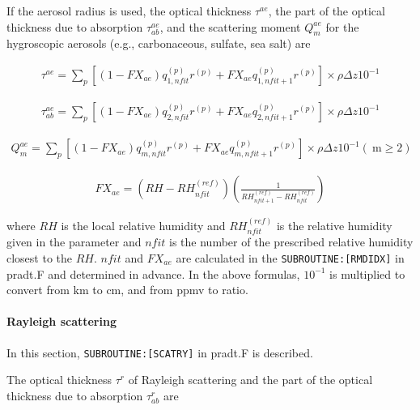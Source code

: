 If the aerosol radius is used, the optical thickness \(\tau^{a e}\), the
part of the optical thickness due to absorption \(\tau_{ab}^{a e}\), and
the scattering moment \(Q_{m}^{a e}\) for the hygroscopic aerosols
(e.g., carbonaceous, sulfate, sea salt) are

\begin{eqnarray}
\tau^{a e}=\sum_{p}\left[\left(1-F X_{a e}\right) q_{1, n f i t}^{(p)} r^{(p)}+F X_{a e} q_{1, n f i t+1}^{(p)} r^{(p)}\right] \times \rho \Delta z 10^{-1}
\end{eqnarray}

\begin{eqnarray}
\tau_{ab}^{a e}=\sum_{p}\left[\left(1-F X_{a e}\right) q_{2, n f i t}^{(p)} r^{(p)}+F X_{a e} q_{2, n f i t+1}^{(p)} r^{(p)}\right] \times \rho \Delta z 10^{-1}
\end{eqnarray}

\begin{eqnarray}
Q_{m}^{a e}=\sum_{p}\left[\left(1-F X_{a e}\right) q_{m, n f i t}^{(p)} r^{(p)}+F X_{a e} q_{m, n f i t+1}^{(p)} r^{(p)}\right] \times \rho \Delta z 10^{-1}(\mathrm{~m} \geq 2)
\end{eqnarray}

\begin{eqnarray}
F X_{a e}=\left(R H-R H_{n f i t}^{(r e f)}\right)\left(\frac{1}{R H_{n f i t+1}^{(r e f)}-R H_{n f i t}^{(r e f)}}\right)
\end{eqnarray}

where \(RH\) is the local relative humidity and
\(R H_{n f i t}^{(r e f)}\) is the relative humidity given in the
parameter and \(nfit\) is the number of the prescribed relative humidity
closest to the \(RH\). \(nfit\) and \(FX_{ae}\) are calculated in the
\texttt{SUBROUTINE:{[}RMDIDX{]}} in pradt.F and determined in advance.
In the above formulas, \(10^{-1}\) is multiplied to convert from
\(\mathrm{km}\) to \(\mathrm{cm}\), and from ppmv to ratio.

\hypertarget{rayleigh-scattering}{%
\paragraph{Rayleigh scattering}\label{rayleigh-scattering}}

In this section, \texttt{SUBROUTINE:{[}SCATRY{]}} in pradt.F is
described.

The optical thickness \(\tau^{r}\) of Rayleigh scattering and the part
of the optical thickness due to absorption \(\tau_{ab}^{r}\) are

